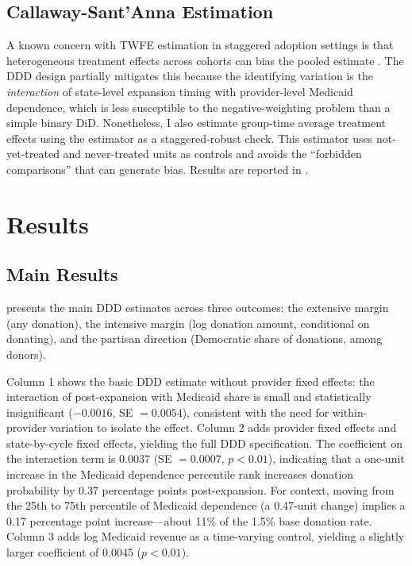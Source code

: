 \documentclass[12pt]{article}
\begin{document}
\subsection{Callaway-Sant'Anna Estimation}

A known concern with TWFE estimation in staggered adoption settings is that heterogeneous treatment effects across cohorts can bias the pooled estimate \citep{goodmanbacon2021difference, sun2021estimating, dechezlepretre2023tax}. The DDD design partially mitigates this because the identifying variation is the \textit{interaction} of state-level expansion timing with provider-level Medicaid dependence, which is less susceptible to the negative-weighting problem than a simple binary DiD. Nonetheless, I also estimate group-time average treatment effects using the \citet{callaway2021difference} estimator as a staggered-robust check. This estimator uses not-yet-treated and never-treated units as controls and avoids the ``forbidden comparisons'' that can generate bias. Results are reported in .


\section{Results}\label{sec:results}

\subsection{Main Results}

 presents the main DDD estimates across three outcomes: the extensive margin (any donation), the intensive margin (log donation amount, conditional on donating), and the partisan direction (Democratic share of donations, among donors).



Column 1 shows the basic DDD estimate without provider fixed effects: the interaction of post-expansion with Medicaid share is small and statistically insignificant ($-0.0016$, SE $= 0.0054$), consistent with the need for within-provider variation to isolate the effect. Column 2 adds provider fixed effects and state-by-cycle fixed effects, yielding the full DDD specification. The coefficient on the interaction term is $0.0037$ (SE $= 0.0007$, $p < 0.01$), indicating that a one-unit increase in the Medicaid dependence percentile rank increases donation probability by 0.37 percentage points post-expansion. For context, moving from the 25th to 75th percentile of Medicaid dependence (a 0.47-unit change) implies a 0.17 percentage point increase---about 11\% of the 1.5\% base donation rate. Column 3 adds log Medicaid revenue as a time-varying control, yielding a slightly larger coefficient of 0.0045 ($p < 0.01$).
\end{document}
